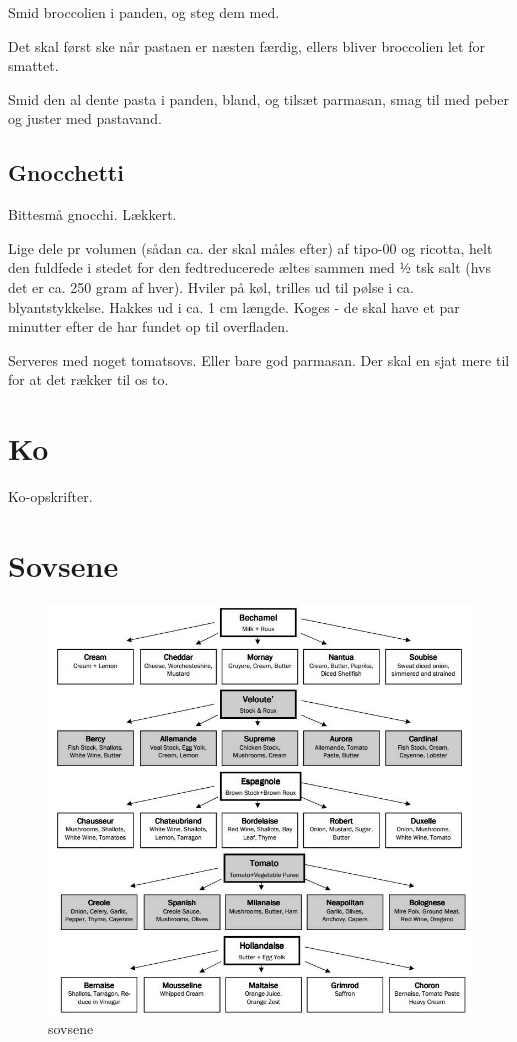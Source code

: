 \documentclass[
]{book}
\begin{document}
Smid broccolien i panden, og steg dem med.

Det skal først ske når pastaen er næsten færdig, ellers bliver broccolien let for smattet.

Smid den al dente pasta i panden, bland, og tilsæt parmasan, smag til med peber og juster med pastavand.

\section{Gnocchetti}\label{gnocchetti}

Bittesmå gnocchi. Lækkert.

Lige dele pr volumen (sådan ca. der skal måles efter) af tipo-00 og ricotta,
helt den fuldfede i stedet for den fedtreducerede æltes sammen med ½ tsk salt
(hvs det er ca. 250 gram af hver).
Hviler på køl, trilles ud til pølse i ca. blyantstykkelse.
Hakkes ud i ca. 1 cm længde.
Koges - de skal have et par minutter efter de har fundet op til overfladen.

Serveres med noget tomatsovs. Eller bare god parmasan. Der skal en sjat mere
til for at det rækker til os to.

\chapter{Ko}\label{ko}

Ko-opskrifter.

\chapter{Sovsene}\label{sovsene}

\begin{figure}
\centering
\includegraphics{images/saucer.jpg}
\caption{sovsene}
\end{figure}
\end{document}
